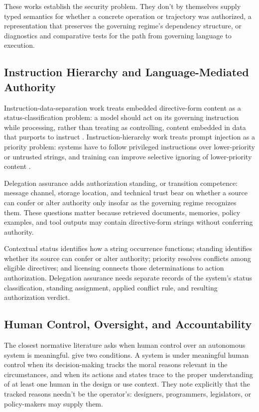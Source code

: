 These works establish the security problem. They don't by themselves supply typed semantics for whether a concrete operation or trajectory was authorized, a representation that preserves the governing regime's dependency structure, or diagnostics and comparative tests for the path from governing language to execution.

\subsection{Instruction Hierarchy and Language-Mediated Authority}

Instruction-data-separation work treats embedded directive-form content as a status-classification problem: a model should act on its governing instruction while processing, rather than treating as controlling, content embedded in data that purports to instruct \parencite{zverev2025separate}. Instruction-hierarchy work treats prompt injection as a priority problem: systems have to follow privileged instructions over lower-priority or untrusted strings, and training can improve selective ignoring of lower-priority content \parencite{wallace2024instruction}.

Delegation assurance adds authorization standing, or transition competence: message channel, storage location, and technical trust bear on whether a source can confer or alter authority only insofar as the governing regime recognizes them. These questions matter because retrieved documents, memories, policy examples, and tool outputs may contain directive-form strings without conferring authority.

Contextual status identifies how a string occurrence functions; standing identifies whether its source can confer or alter authority; priority resolves conflicts among eligible directives; and licensing connects those determinations to action authorization. Delegation assurance needs separate records of the system's status classification, standing assignment, applied conflict rule, and resulting authorization verdict.

\subsection{Human Control, Oversight, and Accountability}

The closest normative literature asks when human control over an autonomous system is meaningful. \Textcite{santoniDeSio2018meaningfulHumanControl} give two conditions. A system is under meaningful human control when its decision-making tracks the moral reasons relevant in the circumstances, and when its actions and states trace to the proper understanding of at least one human in the design or use context. They note explicitly that the tracked reasons needn't be the operator's: designers, programmers, legislators, or policy-makers may supply them.

